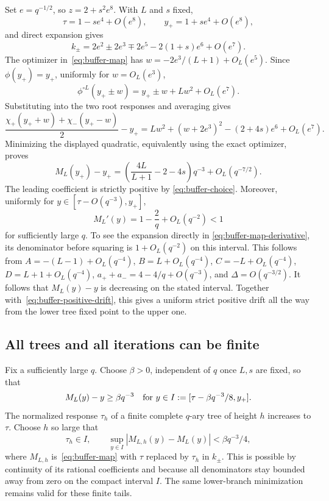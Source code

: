 \documentclass[11pt]{article}
\numberwithin{equation}{section}
\begin{document}
Set $e=q^{-1/2}$, so $z=2+s^2e^8$. With $L$ and $s$ fixed,
\[
 \tau=1-se^4+O(e^8),\qquad
 y_+=1+se^4+O(e^8),
\]
and direct expansion gives
\[
 k_\pm=2e^2\pm2e^3\mp2e^5-2(1+s)e^6+O(e^7).
\]
The optimizer in~\eqref{eq:buffer-map} has
$w=-2e^3/(L+1)+O_L(e^5)$. Since $\phi(y_+)=y_+$,
uniformly for $w=O_L(e^3)$,
\[
 \phi^{\circ L}(y_+\pm w)
 =y_+\pm w+Lw^2+O_L(e^7).
\]
Substituting into the two root responses and averaging gives
\[
 \frac{\chi_+(y_++w)+\chi_-(y_+-w)}2-y_+
 =Lw^2+(w+2e^3)^2-(2+4s)e^6+O_L(e^7).
\]
Minimizing the displayed quadratic, equivalently using the exact
optimizer, proves
\begin{equation}\label{eq:buffer-positive-drift}
 M_L(y_+)-y_+
 =\left(\frac{4L}{L+1}-2-4s\right)q^{-3}
   +O_L(q^{-7/2}).
\end{equation}
The leading coefficient is strictly positive by
\eqref{eq:buffer-choice}.
Moreover, uniformly for $y\in[\tau-O(q^{-3}),y_+]$,
\begin{equation}\label{eq:buffer-contraction}
 M_L'(y)=1-\frac2q+O_L(q^{-2})<1
\end{equation}
for sufficiently large $q$. To see the expansion directly in
\eqref{eq:buffer-map-derivative}, its denominator before squaring is
$1+O_L(q^{-2})$ on this interval. This follows from
$A=-(L-1)+O_L(q^{-4})$, $B=L+O_L(q^{-4})$,
$C=-L+O_L(q^{-4})$, $D=L+1+O_L(q^{-4})$,
$a_++a_-=4-4/q+O(q^{-3})$, and $\Delta=O(q^{-3/2})$.
It follows that $M_L(y)-y$ is decreasing on the stated interval.
Together with~\eqref{eq:buffer-positive-drift}, this gives a uniform
strict positive drift all the way from the lower tree fixed point
to the upper one.

\subsection*{All trees and all iterations can be finite}

Fix a sufficiently large $q$. Choose $\beta>0$, independent of $q$
once $L,s$ are fixed, so that
\[
 M_L(y)-y\ge\beta q^{-3}
 \quad\hbox{for }y\in I:=[\tau-\beta q^{-3}/8,y_+].
\]
The normalized response $\tau_h$ of a finite complete $q$-ary tree
of height $h$ increases to $\tau$. Choose $h$ so large that
\[
 \tau_h\in I,\qquad
 \sup_{y\in I}|M_{L,h}(y)-M_L(y)|<\beta q^{-3}/4,
\]
where $M_{L,h}$ is~\eqref{eq:buffer-map} with $\tau$ replaced by
$\tau_h$ in $k_\pm$. This is possible by continuity of its rational
coefficients and because all denominators stay bounded away from
zero on the compact interval $I$. The same lower-branch
minimization remains valid for these finite tails.
\end{document}
